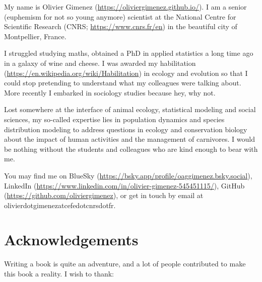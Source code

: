\documentclass[
  12pt,
]{krantz}
\begin{document}
My name is Olivier Gimenez (\url{https://oliviergimenez.github.io/}). I am a senior (euphemism for not so young anymore) scientist at the National Centre for Scientific Research (CNRS; \url{https://www.cnrs.fr/en}) in the beautiful city of Montpellier, France.

I struggled studying maths, obtained a PhD in applied statistics a long time ago in a galaxy of wine and cheese. I was awarded my habilitation (\url{https://en.wikipedia.org/wiki/Habilitation}) in ecology and evolution so that I could stop pretending to understand what my colleagues were talking about. More recently I embarked in sociology studies because hey, why not.

Lost somewhere at the interface of animal ecology, statistical modeling and social sciences, my so-called expertise lies in population dynamics and species distribution modeling to address questions in ecology and conservation biology about the impact of human activities and the management of carnivores. I would be nothing without the students and colleagues who are kind enough to bear with me.

You may find me on BlueSky (\url{https://bsky.app/profile/oaggimenez.bsky.social}), LinkedIn (\url{https://www.linkedin.com/in/olivier-gimenez-545451115/}), GitHub (\url{https://github.com/oliviergimenez}), or get in touch by email at olivier\textbar dot\textbar gimenez\textbar at\textbar cefe\textbar dot\textbar cnrs\textbar dot\textbar fr.

\section*{Acknowledgements}\label{acknowledgements}


Writing a book is quite an adventure, and a lot of people contributed to make this book a reality. I wish to thank:
\end{document}
